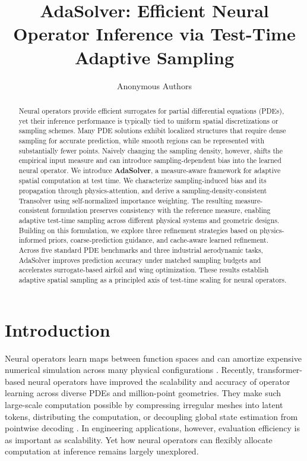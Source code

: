 \documentclass{article}
\title{AdaSolver: Efficient Neural Operator Inference via Test-Time Adaptive Sampling}
\author{Anonymous Authors}
\begin{document}
\maketitle

\begin{abstract}
Neural operators provide efficient surrogates for partial differential equations (PDEs), yet their inference performance is typically tied to uniform spatial discretizations or sampling schemes. Many PDE solutions exhibit localized structures that require dense sampling for accurate prediction, while smooth regions can be represented with substantially fewer points. Naively changing the sampling density, however, shifts the empirical input measure and can introduce sampling-dependent bias into the learned neural operator. We introduce \textbf{AdaSolver}, a measure-aware framework for adaptive spatial computation at test time. We characterize sampling-induced bias and its propagation through physics-attention, and derive a sampling-density-consistent Transolver using self-normalized importance weighting. The resulting measure-consistent formulation  preserves consistency with the reference measure, enabling adaptive test-time sampling across different physical systems and geometric designs. Building on this formulation, we explore three refinement strategies based on physics-informed priors, coarse-prediction guidance, and cache-aware learned refinement. Across five standard PDE benchmarks and three industrial aerodynamic tasks, AdaSolver improves prediction accuracy under matched sampling budgets and accelerates surrogate-based airfoil and wing optimization. These results establish adaptive spatial sampling as a principled axis of test-time scaling for neural operators.
\end{abstract}

\section{Introduction}

Neural operators learn maps between function spaces and can amortize expensive numerical simulation across many physical configurations \citep{li2021fno,li2023gino,wu2024transolver}. Recently, transformer-based neural operators have improved the scalability and accuracy of operator learning across diverse PDEs and million-point geometries. They make such large-scale computation possible by compressing irregular meshes into latent tokens, distributing the computation, or decoupling global state estimation from pointwise decoding \citep{alkin2024upt,luo2025transolverpp,zhou2026transolver3}. In engineering applications, however, evaluation efficiency is as important as scalability. Yet how neural operators can flexibly allocate computation at inference remains largely unexplored.
\end{document}
